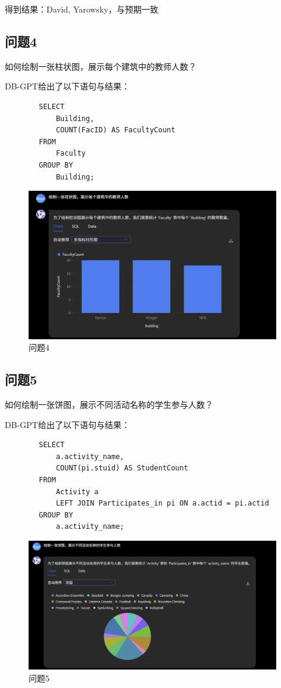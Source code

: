 \documentclass{article}
\begin{document}
	得到结果：David, Yarowsky，与预期一致
	
	\subsection{问题4}
	如何绘制一张柱状图，展示每个建筑中的教师人数？
	
	DB-GPT给出了以下语句与结果：
	
	\begin{verbatim}
		SELECT
			Building,
			COUNT(FacID) AS FacultyCount
		FROM
			Faculty
		GROUP BY
			Building;
	\end{verbatim}
	
	\begin{figure}[H]
		\centering
		\includegraphics[width=11cm]{./images/26.问题4.png}
		\caption{问题4}
	\end{figure}
	
	\subsection{问题5}
	如何绘制一张饼图，展示不同活动名称的学生参与人数？
	
	DB-GPT给出了以下语句与结果：
	
	\begin{verbatim}
		SELECT
			a.activity_name,
			COUNT(pi.stuid) AS StudentCount
		FROM
			Activity a
			LEFT JOIN Participates_in pi ON a.actid = pi.actid
		GROUP BY
			a.activity_name;
	\end{verbatim}
	
	\begin{figure}[H]
		\centering
		\includegraphics[width=11cm]{./images/27.问题5.png}
		\caption{问题5}
	\end{figure}
	
\end{document}
